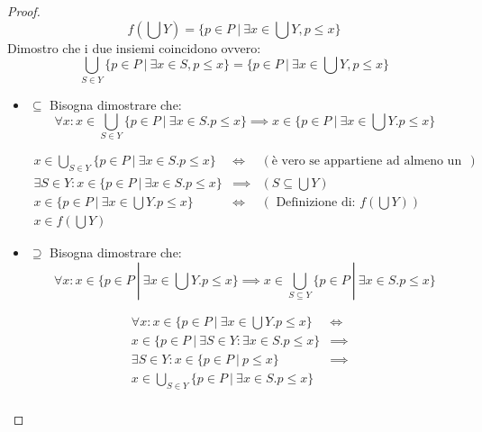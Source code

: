 \begin{proof}
$$
f(\bigcup Y) = \{p \in P\ |\ \exists x \in \bigcup Y, p \leq x\}
$$
Dimostro che i due insiemi coincidono ovvero:
$$
\bigcup_{S \in Y} \{p \in P\ |\ \exists x \in S, p \leq x\} =  \{p \in P\ |\ \exists x \in \bigcup Y, p \leq x\}
$$
\begin{itemize}
	\item $\boxed{\subseteq}$ Bisogna dimostrare che:
	$$
	\forall x : x \in \bigcup_{S \in Y} \{p \in P\ |\ \exists x \in S. p \leq x\} \implies x \in \{p \in P\ |\ \exists x \in \bigcup Y. p \leq x\}
	$$
	
	$$
	\begin{array}{llr}
	x \in \bigcup_{S \in Y} \{p \in P\ |\ \exists x \in S. p \leq x\} & \iff & (\text{è vero se appartiene ad almeno un sottinsieme di Y})\\
	\exists S \in Y: x \in \{p \in P\ |\ \exists x \in S. p \leq x\} & \implies & (S \subseteq \bigcup Y)\\
	x \in \{p \in P\ |\ \exists x \in \bigcup Y. p \leq x \} & \iff & (\text{ Definizione di: } f(\bigcup Y)) \\
	x \in f(\bigcup Y)
	\end{array}
	$$
	\item $\boxed{\supseteq}$ Bisogna dimostrare che:
	$$
	\forall x : x \in \{p \in P\ |\ \exists x \in \bigcup Y. p \leq x\} \implies x \in 
	\bigcup_{S \subseteq Y} \{p \in P\ |\ \exists x \in S. p \leq x\} 
	$$ 
	
	$$
	\begin{array}{lll}
	\forall x : x \in \{p \in P\ |\ \exists x \in \bigcup Y. p \leq x\} & \iff & \\
	x \in \{p \in P\ |\ \exists S \in Y: \exists x \in S. p \leq x \} & \implies & \\
	\exists S \in Y : x \in \{p \in P\ |\ p \leq x \} & \implies & \\
	x \in \bigcup_{S \in Y} \{p \in P\ |\ \exists x \in S. p \leq x\} & & \\
	
	\end{array}
	$$
\end{itemize}



\end{proof}

\let\powerset\undefined
